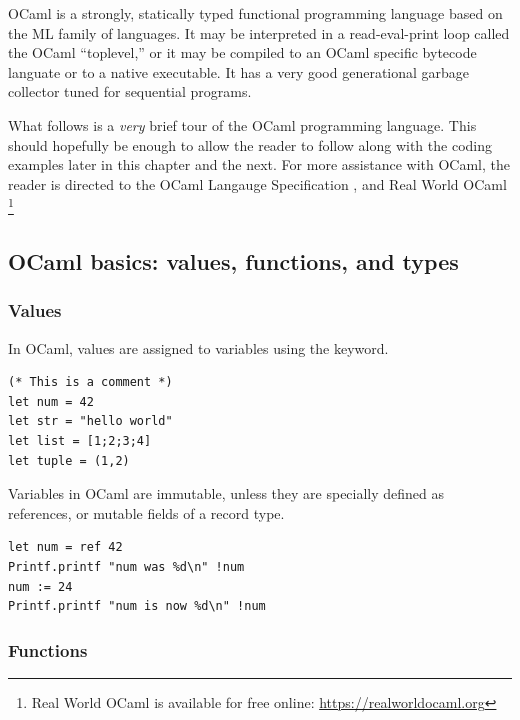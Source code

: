 
OCaml is a strongly, statically typed functional programming language
based on the ML family of languages. It may be interpreted in a
read-eval-print loop called the OCaml ``toplevel,'' or it may be
compiled to an OCaml specific bytecode languate or to a native
executable. \cite{ocaml:spec} It has a very good generational garbage
collector tuned for sequential programs. \cite{ocaml:gc_tutorial}

What follows is a \textit{very} brief tour of the OCaml programming
language. This should hopefully be enough to allow the reader to
follow along with the coding examples later in this chapter and the
next. For more assistance with OCaml, the reader is directed to the
OCaml Langauge Specification \cite{ocaml:spec}, and Real World OCaml
\cite{rwo}\footnote{Real World OCaml is available for free online:
  \url{https://realworldocaml.org}}

\subsection{OCaml basics: values, functions, and types}

\subsubsection{Values}

In OCaml, values are assigned to variables using the 
keyword.

\begin{lstlisting}
(* This is a comment *)
let num = 42
let str = "hello world"
let list = [1;2;3;4]
let tuple = (1,2)
\end{lstlisting}

Variables in OCaml are immutable, unless they are specially defined as
references, or mutable fields of a record type.

\begin{lstlisting}
let num = ref 42
Printf.printf "num was %d\n" !num
num := 24
Printf.printf "num is now %d\n" !num
\end{lstlisting}

\subsubsection{Functions}

